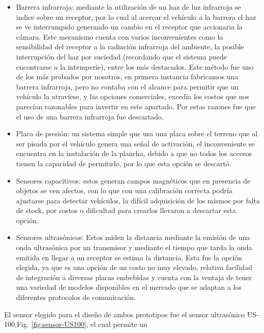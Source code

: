 \begin{itemize}
    \item Barrera infrarroja: mediante la utilización de un haz de luz infrarroja se indice sobre un receptor, por  lo cual al acercar el vehículo a
          la barrera el haz se ve interrumpido generando un cambio en el receptor que accionaria la cámara. Este mecanismo cuenta con varios inconvenientes
          como la sensibilidad del receptor a la radiación infrarroja del ambiente, la posible interrupción del haz por suciedad (recordando que el
          sistema puede encontrarse a la intemperie), entre los  más destacados. Este método fue uno de los más probados por nosotros, en primera instancia
          fabricamos una barrera infrarroja, pero no contaba con el alcance para permitir que un vehículo la atraviese, y las opciones comerciales, excedía
          los costos que nos parecían razonables para invertir en este apartado. Por estas razones fue que el uso de una barrera infrarroja fue descartado.

    \item Placa de presión: un sistema simple que usa una placa sobre el terreno que al ser pisada por el vehículo
          genera una señal de activación, el inconveniente se encuentra en la instalación de la plancha, debido a que no todos
          los accesos tienen la capacidad de permitirlo, por lo que esta opción se descartó.

    \item Sensores capacitivos: estos generan campos magnéticos que en presencia de objetos se ven afectos, con lo
          que con una calibración correcta podría ajustarse para detectar vehículos, la difícil adquisición de los mismos por falta de stock, por costos o
          dificultad para crearlos llevaron a descartar esta opción.

    \item Sensores ultrasónicos: Estos miden la distancia mediante la emisión de una onda ultrasónica por un transmisor y
          mediante el tiempo que tarda la onda emitida en llegar a un receptor se estima la distancia. Esta fue la opción elegida, ya que es una opción
          de un costo no muy elevado, relativa facilidad de integración a diversas placas embebidas y cuenta con la ventaja de tener una variedad de modelos
          disponibles en el mercado que se adaptan a los diferentes protocolos de comunicación.
\end{itemize}
El sensor elegido para el diseño de ambos prototipos fue el sensor ultrasónico US-100,Fig. \ref{fig:sensor-US100}, el cual permite un
